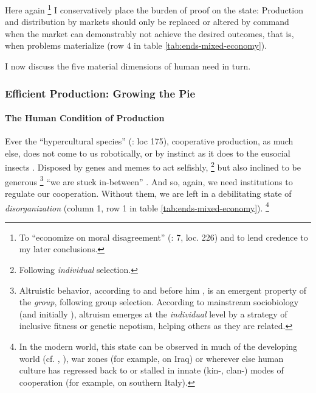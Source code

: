 Here again
\footnote{
	To ``economize on moral disagreement'' (\citealt{GutmannThompson-2004-aa}: 7,  loc. 226) and to lend credence to my later conclusions.
}
I conservatively place the burden of proof on the state:
Production and distribution by markets should only be replaced or altered by command when the market can demonstrably not achieve the desired outcomes, that is, when problems materialize (row 4 in table \ref{tab:ends-mixed-economy}).

I now discuss the five material dimensions of human need in turn.

\subsubsection[Efficient Production]{Efficient Production: Growing the Pie}\label{sec:production}

\paragraph{The Human Condition of Production} \label{sec:human-condition-of-production}
Ever the ``hypercultural species'' (\citealt{Henrich2007}: loc 175), cooperative production, as much else, does not come to us robotically, or by instinct as it does to the eusocial insects \citep{Wilson2012}.
Disposed by genes and memes to act selfishly,
\footnote{
	Following \emph{individual} selection.
}
but also inclined to be generous
\footnote{
	Altruistic behavior, according to \cite{Wilson2012} and before him \cite{Darwin1859}, is an emergent property of the \emph{group}, following group selection.
	According to mainstream sociobiology (and initially \citealt{Wilson1975}), altruism emerges at the \emph{individual} level by a strategy of inclusive fitness or genetic nepotism, helping others as they are related.
}
``we are stuck in-between'' \citep{Lehrer2012}.
And so, again, we need institutions to regulate our cooperation.
Without them, we are left in a debilitating state of \emph{disorganization} (column 1, row 1 in table \ref{tab:ends-mixed-economy}).
\footnote{
	In the modern world, this state can be observed in much of the developing world (cf. \citealt{Clark2007}, \citealt{Easterly-2006-aa}), war zones (for example, \citealt{Baker-IIIHamilton-2006-aa} on Iraq) or wherever else human culture has regressed back to or stalled in innate (kin-, clan-) modes of cooperation (for example, \citealt{PutnamLeonardi-1993-aa} on southern Italy).
}


